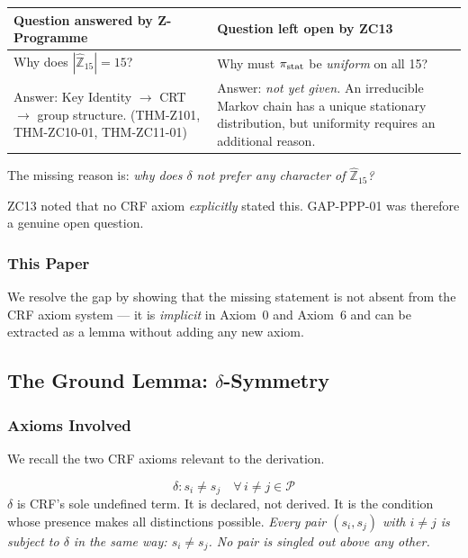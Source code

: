 \documentclass[12pt, a4paper]{article}
\begin{document}
\begin{center}
{\small
\renewcommand{\arraystretch}{1.30}
\begin{tabular}{p{6.5cm} p{6.5cm}}
\toprule
\textbf{Question answered by Z-Programme} &
\textbf{Question left open by ZC13} \\
\midrule
Why does $|\widehat{\mathbb{Z}}_{15}| = 15$? &
Why must $\pi_{\rm stat}$ be \emph{uniform} on all 15? \\
\midrule
Answer: Key Identity $\to$ CRT $\to$ group structure.
(THM-Z101, THM-ZC10-01, THM-ZC11-01) &
Answer: \emph{not yet given.} An irreducible Markov chain has
a unique stationary distribution, but uniformity requires
an additional reason. \\
\bottomrule
\end{tabular}
}
\end{center}

The missing reason is: \emph{why does $\delta$ not prefer any
character of $\widehat{\mathbb{Z}}_{15}$?}

ZC13 noted that no CRF axiom \emph{explicitly} stated this.
GAP-PPP-01 was therefore a genuine open question.

\subsubsection{This Paper}

We resolve the gap by showing that the missing statement is not
absent from the CRF axiom system --- it is \emph{implicit} in
Axiom~0 and Axiom~6 and can be extracted as a lemma without
adding any new axiom.

\subsection{The Ground Lemma: $\delta$-Symmetry}
\label{zc14:sec:lemma}

\subsubsection{Axioms Involved}
\label{zc14:sec:axioms-review}

We recall the two CRF axioms relevant to the derivation.

\begin{formalbox}[title={Axiom~0: Distinction ($\delta$) ---
  Indefinable Primitive (CRF v17.5 Part~I)}]
\[
  \delta : s_i \neq s_j \quad \forall\, i \neq j \in \mathcal{P}
\]
$\delta$ is CRF's sole undefined term. It is declared, not derived.
It is the condition whose presence makes all distinctions possible.
\emph{Every pair $(s_i, s_j)$ with $i\neq j$ is subject to
$\delta$ in the same way: $s_i \neq s_j$.
No pair is singled out above any other.}
\end{formalbox}
\end{document}
